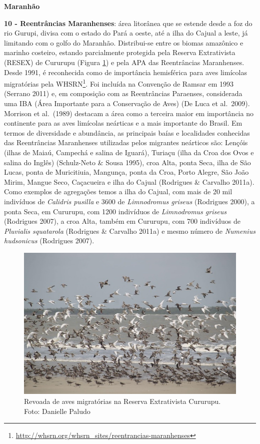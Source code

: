 \documentclass[
  oneside]{scrbook}
\DeclareRobustCommand{\href}[2]{#2\footnote{\url{#1}}}
\begin{document}
\textbf{Maranhão}

\textbf{10 - Reentrâncias Maranhenses}: área litorânea que se estende desde a foz do rio Gurupi, divisa com o estado do Pará a oeste, até a ilha do Cajual a leste, já limitando com o golfo do Maranhão. Distribui-se entre os biomas amazônico e marinho costeiro, estando parcialmente protegida pela Reserva Extrativista (RESEX) de Cururupu (Figura \ref{fig:22}) e pela APA das Reentrâncias Maranhenses. Desde 1991, é \href{http://whsrn.org/whsrn_sites/reentrancias-maranhenses}{reconhecida como de importância hemisférica para aves limícolas migratórias pela WHSRN}. Foi incluída na Convenção de Ramsar em 1993 (Serrano 2011) e, em composição com as Reentrâncias Paraenses, considerada uma IBA (Área Importante para a Conservação de Aves) (De Luca et al.~2009). Morrison et al.~(1989) destacam a área como a terceira maior em importância no continente para as aves limícolas neárticas e a mais importante do Brasil. Em termos de diversidade e abundância, as principais baías e localidades conhecidas das Reentrâncias Maranhenses utilizadas pelos migrantes neárticos são: Lençóis (ilhas de Maiaú, Campechá e salina de Iguará), Turiaçu (ilha da Croa dos Ovos e salina do Inglês) (Schulz-Neto \& Sousa 1995), croa Alta, ponta Seca, ilha de São Lucas, ponta de Muricitiuia, Mangunça, ponta da Croa, Porto Alegre, São João Mirim, Mangue Seco, Caçacueira e ilha do Cajual (Rodrigues \& Carvalho 2011a). Como exemplos de agregações temos a ilha do Cajual, com mais de 20 mil indivíduos de \emph{Calidris pusilla} e 3600 de \emph{Limnodromus griseus} (Rodrigues 2000), a ponta Seca, em Cururupu, com 1200 indivíduos de \emph{Limnodromus griseus} (Rodrigues 2007), a croa Alta, também em Cururupu, com 700 indivíduos de \emph{Pluvialis squatarola} (Rodrigues \& Carvalho 2011a) e mesmo número de \emph{Numenius hudsonicus} (Rodrigues 2007).

\begin{figure}[H]

{\centering \includegraphics[width=0.75\linewidth]{imagens/cap07/Figura_7.2} 

}

\caption{Revoada de aves migratórias na Reserva Extrativista Cururupu. Foto: Danielle Paludo}\label{fig:22}
\end{figure}
\end{document}
